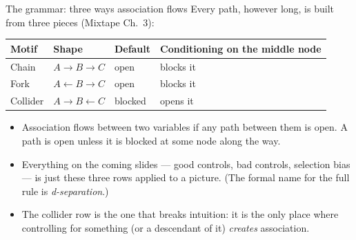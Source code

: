 \documentclass[aspectratio=169,11pt]{beamer}
\begin{document}
\begin{frame}{The grammar: three ways association flows}
Every path, however long, is built from three pieces (Mixtape Ch.~3):
\begin{center}
\begin{tabular}{llll}
\hline
Motif & Shape & Default & Conditioning on the middle node \\
\hline
\alert{Chain} & $A \rightarrow B \rightarrow C$ & open & \alert{blocks} it \\
\alert{Fork} & $A \leftarrow B \rightarrow C$ & open & \alert{blocks} it \\
\alert{Collider} & $A \rightarrow B \leftarrow C$ & \alert{blocked} & \alert{opens} it \\
\hline
\end{tabular}
\end{center}
\bigskip
\begin{itemize}
	\item Association flows between two variables if \alert{any} path between them is
	open. A path is open unless it is blocked at some node along the way.

	\item Everything on the coming slides --- good controls, bad controls, selection
	bias --- is just these three rows applied to a picture.
	(The formal name for the full rule is \emph{d-separation}.)

	\item The collider row is the one that breaks intuition: it is the only place
	where controlling for something (or a descendant of it) \emph{creates} association.
\end{itemize}
\end{frame}
\end{document}
